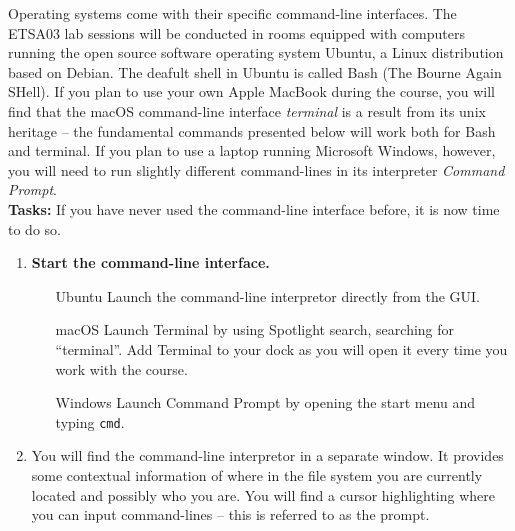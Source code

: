 \documentclass{scrreprt}
\begin{document}
Operating systems come with their specific command-line interfaces. The ETSA03 lab sessions will be conducted in rooms equipped with computers running the open source software operating system Ubuntu, a Linux distribution based on Debian. The deafult shell in Ubuntu is called Bash (The Bourne Again SHell). If you plan to use your own Apple MacBook during the course, you will find that the macOS command-line interface \textit{terminal} is a result from its unix heritage -- the fundamental commands presented below will work both for Bash and terminal. If you plan to use a laptop running Microsoft Windows, however, you will need to run slightly different command-lines in its interpreter \textit{Command Prompt}.\\

\textbf{Tasks:} If you have never used the command-line interface before, it is now time to do so. 

\begin{enumerate}
\item \textbf{Start the command-line interface.} 
\begin{itemize}
\item[Ubuntu] Launch the command-line interpretor directly from the GUI.
\item[macOS] Launch Terminal by using Spotlight search, searching for ``terminal''. Add Terminal to your dock as you will open it every time you work with the course.
\item[Windows] Launch Command Prompt by opening the start menu and typing \texttt{cmd}.
\end{itemize}
\item You will find the command-line interpretor in a separate window. It  provides some contextual information of where in the file system you are currently located and possibly who you are. You will find a cursor highlighting where you can input command-lines -- this is referred to as the prompt.
\end{enumerate}
\end{document}
